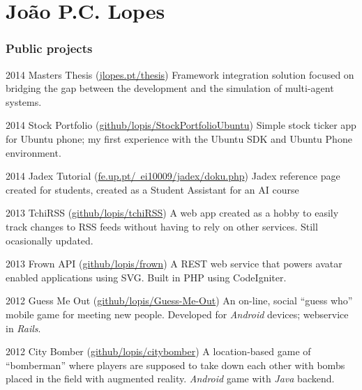 \documentclass{tccv}
\begin{document}
\part{João P.C. Lopes}

\section{Public projects}

\begin{yearlist}

\item{2014}
    {Masters Thesis \newline
    (\href{http://jlopes.pt/thesis}{jlopes.pt/thesis})}
    {Framework integration solution focused on bridging the gap between the development and the simulation of multi-agent systems.}

\item{2014}
    {Stock Portfolio \newline
    (\href{https://github.com/lopis/StockPortfolioUbuntu}{github/lopis/StockPortfolioUbuntu})}
    {Simple stock ticker app for Ubuntu phone; my first experience with the Ubuntu SDK and Ubuntu Phone environment.}

\item{2014}
    {Jadex Tutorial \newline
    (\href{http://paginas.fe.up.pt/~ei10009/jadex/doku.php}{fe.up.pt/~ei10009/jadex/doku.php})}
    {Jadex reference page created for students, created as a Student Assistant for an AI course}

\item{2013}
    {TchiRSS \newline
    (\href{https://github.com/lopis/tchiRSS}{github/lopis/tchiRSS})}
    {A web app created as a hobby to easily track changes to RSS feeds without having to rely on other services. Still ocasionally updated. }

\item{2013}
    {Frown API \newline
    (\href{https://github.com/lopis/frown}{github/lopis/frown})}
    {A REST web service that powers avatar enabled applications using SVG.
    Built in PHP using CodeIgniter.}

\item{2012}
    {Guess Me Out \newline
    (\href{https://github.com/lopis/Guess-Me-Out}{github/lopis/Guess-Me-Out})}
    {An on-line, social ``guess who'' mobile game for meeting new people.
    Developed for \emph{Android} devices; webservice in \emph{Rails}.}

\item{2012}
    {City Bomber \newline
    (\href{https://github.com/lopis/citybomber}{github/lopis/citybomber})}
    {A location-based game of ``bomberman'' where players are supposed
    to take down each other with bombs placed in the field with augmented reality. \emph{Android} game with \emph{Java} backend.}

\end{yearlist}
\end{document}
